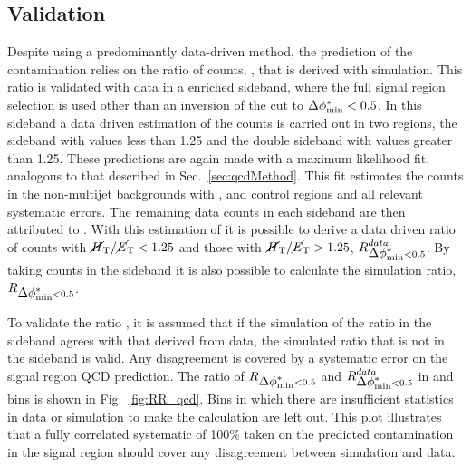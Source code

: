 \subsection{Validation} 
\label{sec:qcdVal}

Despite using a predominantly data-driven method, the prediction of
the \QCD contamination relies on the ratio of \QCD counts, \rmhtmet,
that is derived with simulation. This ratio is validated with data in
a \QCD enriched sideband, where the full signal region selection is used
other than an inversion of the \bdphi cut to $\mbox{$\Delta\phi^{*}_{\rm min}$}<0.5$. In this
sideband a data driven estimation of the \QCD counts is carried out in
two regions, the \bdphi sideband with \mhtmet values less than 1.25
and the double sideband with
values greater than 1.25. These predictions are again made with a maximum
likelihood fit, analogous to that described in
Sec.~\ref{sec:qcdMethod}. This fit estimates the counts in the
non-multijet backgrounds with \mj, \mmj and \gj
control regions and all relevant systematic errors. The
remaining data counts in each sideband are then attributed to \QCD.
With this estimation of \QCD it is possible to derive a data driven
ratio of \QCD counts with $\mbox{$\mbox{$\cancel{H}_\text{T}$} / \mbox{$\cancel{E}_\text{T}$}$}<1.25$ and those with $\mbox{$\mbox{$\cancel{H}_\text{T}$} / \mbox{$\cancel{E}_\text{T}$}$}>1.25$,
$\mbox{$R$}_{\mbox{$\Delta\phi^{*}_{\rm min}$}<0.5}^{data}$. By taking \MC counts in the \bdphi
sideband it is also possible to calculate the \mhtmet simulation
ratio, $\mbox{$R$}_{\mbox{$\Delta\phi^{*}_{\rm min}$}<0.5}$. 

To validate the ratio \rmhtmet, it is assumed that if the simulation of
the ratio in the \bdphi sideband agrees with that derived from data,
the simulated ratio that is not in the sideband is valid. Any
disagreement is covered by a systematic error on the signal region QCD
prediction. The ratio of $\mbox{$R$}_{\mbox{$\Delta\phi^{*}_{\rm min}$}<0.5}$ and
$\mbox{$R$}_{\mbox{$\Delta\phi^{*}_{\rm min}$}<0.5}^{data}$ in \scalht and \njet bins is shown in
Fig.~\ref{fig:RR_qcd}. Bins in which there are insufficient statistics
in data or simulation to make the calculation are left out. This plot
illustrates that a fully correlated systematic of 100\% taken on the
predicted \QCD contamination in the signal region should cover any
disagreement between simulation and data.

